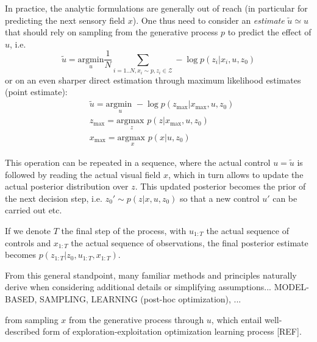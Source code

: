 \documentclass[12pt,twoside,openright]{article}
\begin{document}
{	In practice, the analytic formulations are generally out of reach (in particular for predicting the next sensory field $x$).  One thus need to consider an \emph{estimate} $\tilde{u} \simeq \hat{u}$ that should rely on sampling from the generative process $p$ to 
			predict the effect of $u$,  i.e. 
			$$ \tilde{u} = \underset{u}{\text{argmin}} \frac{1}{N} \sum_{i = 1..N, x_i \sim p, z_i \in \mathcal{Z}} -\log p(z_i| x_i, u, z_0) $$ or on an even sharper direct estimation through maximum likelihood estimates (point estimate):
			\begin{align*}
				&\tilde{u} = \underset{u}{\text{argmin }} - \log p(z_\text{max}|x_\text{max}, u, z_0)	\\
				&z_\text{max} = \underset{z}{\text{argmax }} p(z|x_\text{max}, u, z_0)\\
				&x_\text{max} = \underset{x}{\text{argmax }} p(x|u,z_0)
			\end{align*}
		}
	
	This operation can be repeated in a sequence, where the actual control $u = \tilde{u}$ is followed by reading the actual visual field $x$, which in turn allows to update the actual posterior distribution over $z$. This updated posterior becomes the prior of the next decision step, i.e. $z_0'\sim  p(z|x, u, z_0)$ so that a new control $u'$ can be carried out etc. 
	
	If we denote $T$ the final step of the process,  with $u_{1:T}$ the actual sequence of controls and $x_{1:T}$ the actual sequence of observations, the final posterior estimate becomes $p(z_{1:T}|z_0, u_{1:T}, x_{1:T})$.
	
 

	
	
		{\color{green} From this general standpoint, many familiar methods and principles naturally derive when considering additional details or simplifying assumptions... MODEL-BASED, SAMPLING, LEARNING (post-hoc optimization), ...}
		
		{\color{green} from sampling $x$ from the generative process through $u$, which entail well-described form of exploration-exploitation optimization learning process [REF].}
		
\end{document}
